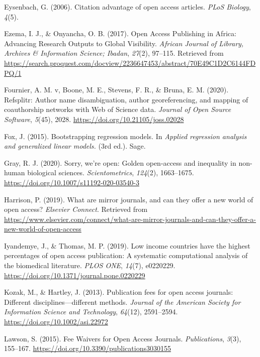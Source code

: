 \documentclass[english,man]{apa6}
\begin{document}
\leavevmode\hypertarget{ref-eysenbach_citation_2006}{}%
Eysenbach, G. (2006). Citation advantage of open access articles. \emph{PLoS Biology}, \emph{4}(5).

\leavevmode\hypertarget{ref-ezema_open_2017}{}%
Ezema, I. J., \& Onyancha, O. B. (2017). Open Access Publishing in Africa: Advancing Research Outputs to Global Visibility. \emph{African Journal of Library, Archives \& Information Science; Ibadan}, \emph{27}(2), 97--115. Retrieved from \url{https://search.proquest.com/docview/2236647453/abstract/70E49C1D2C6144FDPQ/1}

\leavevmode\hypertarget{ref-fournier_refsplitr_2020}{}%
Fournier, A. M. v, Boone, M. E., Stevens, F. R., \& Bruna, E. M. (2020). Refsplitr: Author name disambiguation, author georeferencing, and mapping of coauthorship networks with Web of Science data. \emph{Journal of Open Source Software}, \emph{5}(45), 2028. \url{https://doi.org/10.21105/joss.02028}

\leavevmode\hypertarget{ref-fox_bootstrapping_2015}{}%
Fox, J. (2015). Bootstrapping regression models. In \emph{Applied regression analysis and generalized linear models.} (3rd ed.). Sage.

\leavevmode\hypertarget{ref-gray_sorry_2020}{}%
Gray, R. J. (2020). Sorry, we're open: Golden open-access and inequality in non-human biological sciences. \emph{Scientometrics}, \emph{124}(2), 1663--1675. \url{https://doi.org/10.1007/s11192-020-03540-3}

\leavevmode\hypertarget{ref-harrison_what_2019}{}%
Harrison, P. (2019). What are mirror journals, and can they offer a new world of open access? \emph{Elsevier Connect}. Retrieved from \url{https://www.elsevier.com/connect/what-are-mirror-journals-and-can-they-offer-a-new-world-of-open-access}

\leavevmode\hypertarget{ref-iyandemye_low_2019}{}%
Iyandemye, J., \& Thomas, M. P. (2019). Low income countries have the highest percentages of open access publication: A systematic computational analysis of the biomedical literature. \emph{PLOS ONE}, \emph{14}(7), e0220229. \url{https://doi.org/10.1371/journal.pone.0220229}

\leavevmode\hypertarget{ref-kozak_publication_2013}{}%
Kozak, M., \& Hartley, J. (2013). Publication fees for open access journals: Different disciplines---different methods. \emph{Journal of the American Society for Information Science and Technology}, \emph{64}(12), 2591--2594. \url{https://doi.org/10.1002/asi.22972}

\leavevmode\hypertarget{ref-lawson_fee_2015}{}%
Lawson, S. (2015). Fee Waivers for Open Access Journals. \emph{Publications}, \emph{3}(3), 155--167. \url{https://doi.org/10.3390/publications3030155}
\end{document}
